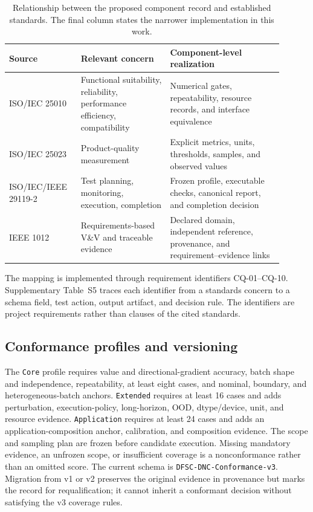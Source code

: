 \documentclass[preprint,12pt]{elsarticle}
\begin{document}
\begin{table}[t]
\centering
\small
\setlength{\tabcolsep}{4pt}
\caption{Relationship between the proposed component record and established standards. The final column states the narrower implementation in this work.}
\label{tab:standards-map}
\begin{tabular}{>{\raggedright\arraybackslash}p{0.22\linewidth}>{\raggedright\arraybackslash}p{0.30\linewidth}>{\raggedright\arraybackslash}p{0.38\linewidth}}
\toprule
Source & Relevant concern & Component-level realization\\
\midrule
ISO/IEC 25010 & Functional suitability, reliability, performance efficiency, compatibility & Numerical gates, repeatability, resource records, and interface equivalence\\
ISO/IEC 25023 & Product-quality measurement & Explicit metrics, units, thresholds, samples, and observed values\\
ISO/IEC/IEEE 29119-2 & Test planning, monitoring, execution, completion & Frozen profile, executable checks, canonical report, and completion decision\\
IEEE 1012 & Requirements-based V\&V and traceable evidence & Declared domain, independent reference, provenance, and requirement--evidence links\\
\bottomrule
\end{tabular}
\end{table}

The mapping is implemented through requirement identifiers CQ-01--CQ-10. Supplementary Table~S5 traces each identifier from a standards concern to a schema field, test action, output artifact, and decision rule. The identifiers are project requirements rather than clauses of the cited standards.

\subsection{Conformance profiles and versioning}
The \texttt{Core} profile requires value and directional-gradient accuracy, batch shape and independence, repeatability, at least eight cases, and nominal, boundary, and heterogeneous-batch anchors. \texttt{Extended} requires at least 16 cases and adds perturbation, execution-policy, long-horizon, OOD, dtype/device, unit, and resource evidence. \texttt{Application} requires at least 24 cases and adds an application-composition anchor, calibration, and composition evidence. The scope and sampling plan are frozen before candidate execution. Missing mandatory evidence, an unfrozen scope, or insufficient coverage is a nonconformance rather than an omitted score. The current schema is \texttt{DFSC-DNC-Conformance-v3}. Migration from v1 or v2 preserves the original evidence in provenance but marks the record for requalification; it cannot inherit a conformant decision without satisfying the v3 coverage rules.
\end{document}
